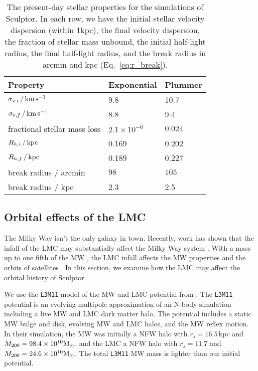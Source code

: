 \begin{table*}[t]
\centering
\caption[Simulation results for Sculptor’s stars]{The present-day stellar properties for the simulations of Sculptor. In each row, we have the initial stellar velocity dispersion (within 1kpc), the final velocity dispersion, the fraction of stellar mass unbound, the initial half-light radius, the final half-light radius, and the break radius in arcmin and kpc (Eq. \ref{eq:r_break}). }
\label{tbl:scl_sim_stars_results}
\begin{tabular}{lll}
\toprule
Property & Exponential & Plummer\\
\midrule
$\sigma_{{\rm v}, i}\,/\,{\rm km\,s^{-1}}$ & 9.8 & 10.7\\
$\sigma_{{\rm v}, f} \,/\,{\rm km\,s^{-1}}$ & 8.8 & 9.4\\
fractional stellar mass loss & $2.1\times 10^{-6}$ & $0.024$\\
$R_{h, i}\,/\,{\rm kpc}$ & 0.169 & 0.202\\
$R_{h, f}\,/\,{\rm kpc}$ & 0.189 & 0.227\\
break radius $/$ arcmin & $98$ & $105$\\
break radius $/$ kpc & 2.3 & 2.5\\
\bottomrule
\end{tabular}
\end{table*}

\subsection{Orbital effects of the LMC}\label{sec:scl_lmc}

The Milky Way isn't the only galaxy in town. Recently, work has shown
that the infall of the LMC may substantially affect the Milky Way system
\citep[e.g.,][]{erkal+2019, cautun+2019, garavito-camargo+2021, vasiliev2023}.
With a mass up to one fifth of the MW \citep[e.g.,][]{penarrubia+2015},
the LMC infall affects the MW properties and the orbits of satellites
\citep[see
e.g.,][]{patel+2020, battaglia+2022, correamagnus+vasiliev2022}. In this
section, we examine how the LMC may affect the orbital history of
Sculptor.

We use the \texttt{L3M11} model of the MW and LMC potential from
\citet{vasiliev2024}. The \texttt{L3M11} potential is an evolving
multipole approximation of an N-body simulation including a live MW and
LMC dark matter halo. The potential includes a static MW bulge and disk,
evolving MW and LMC halos, and the MW reflex motion. In their
simulation, the MW was initially a NFW halo with \(r_s=16.5\,\)kpc and
\(M_{\rm 200}= 98.4\times10^{10}{\rm M}_{\odot}\), and the LMC a NFW halo with
\(r_s=11.7\) and \(M_{200} = 24.6 \times 10^{10} {\rm M}_{\odot}\). The total
\texttt{L3M11} MW mass is lighter than our initial \citet{EP2020}
potential.

